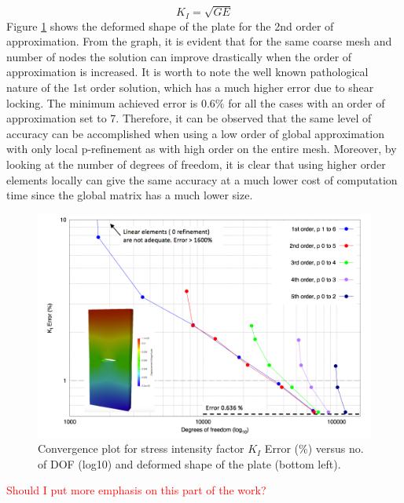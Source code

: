 \documentclass[11pt]{ACMEarticle}
\numberwithin{equation}{section}
\begin{document}
\begin{equation}
K_I = \sqrt{GE}
\end{equation}
Figure \ref{fig:plate_conv_no_sing} shows the deformed shape of the plate for the 2nd order of approximation. From the graph, it is evident that for the same coarse mesh and number of nodes the solution can improve drastically when the order of approximation is increased. It is worth to note the well known pathological nature of the 1st order solution, which has a much higher error due to shear locking. The minimum achieved error is $0.6\%$ for all the cases with an order of approximation set to 7. Therefore, it can be observed that the same level of accuracy can be accomplished when using a low order of global approximation with only local p-refinement as with high order on the entire mesh. Moreover, by looking at the number of degrees of freedom, it is clear that using higher order elements locally can give the same accuracy at a much lower cost of computation time since the global matrix has a much lower size.
\begin{figure}
	\centering
	\includegraphics[width=0.7\linewidth]{Figures/graphs/plate_conv_no_sing}
	\caption{Convergence plot for stress intensity factor $K_I$ Error (\%) versus no. of DOF (log10) and deformed shape of the plate (bottom left).}
	\label{fig:plate_conv_no_sing}
\end{figure}
\textcolor{red}{Should I put more emphasis on this part of the work?}
\end{document}
